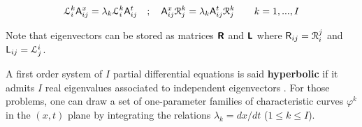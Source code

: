 \begin{equation}
  \label{eq:eigenvectors}
  \mathcal{L}^k_i  \mathsf{A}^x_{ij} = \lambda_k \mathcal{L}^k_i \mathsf{A}^t_{ij} \quad ; \quad \mathsf{A}^x_{ij}\mathcal{R}^k_j = \lambda_k \mathsf{A}^t_{ij}\mathcal{R}^k_j \qquad k=1,...,I
\end{equation}
\begin{remark}
  Note that eigenvectors can be stored as matrices $\boldsymbol{\mathsf{R}}$ and $\boldsymbol{\mathsf{L}}$ where $\mathsf{R}_{ij}=\mathcal{R}^j_i$ and $\mathsf{L}_{ij}=\mathcal{L}_j^i$.
\end{remark}

\begin{definition}
  \label{def:hyperbolic_system}
  A first order system of $I$ partial differential equations is said \textbf{hyperbolic} if it admits $I$ real eigenvalues associated to independent eigenvectors \cite{Courant}.
For those problems, one can draw a set of one-parameter families of characteristic curves $\varphi^k$ in the $(x,t)$ plane by integrating the relations $\lambda_k=dx/dt$ ($1 \leq k \leq I$).
\end{definition}

